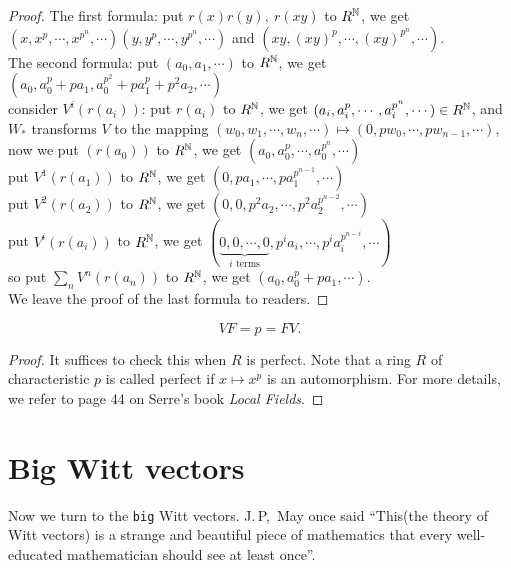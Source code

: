 \begin{proof}
The first formula: put $r(x)r(y),\ r(xy)$ to $R^{\mathbb{N}}$, we get $(x,x^p,\cdots,x^{p^n},\cdots)(y,y^p,\cdots,y^{p^n},\cdots)$ and $(xy,(xy)^p,\cdots,(xy)^{p^n},\cdots)$.\\
The second formula: put $(a_0,a_1,\cdots)$ to $R^{\mathbb{N}}$, we get $(a_0,a_0^p+pa_1,a_0^{p^2}+pa_1^p+p^2a_2,\cdots)$\\
consider $V^i(r(a_i))$: put $r(a_i)$ to $R^{\mathbb{N}}$, we get $(a_i,a_i^p,\cdots,a_i^{p^n},\cdots)\in R^{\mathbb{N}}$, and $W_*$ transforms $V$ to the mapping $(w_0,w_1,\cdots,w_n,\cdots)\mapsto (0,pw_0,\cdots,pw_{n-1},\cdots)$, \\
now we put $(r(a_0))$ to $R^{\mathbb{N}}$, we get $(a_0,a_0^p,\cdots,a_0^{p^n},\cdots)$\\
put $V^1(r(a_1))$ to $R^{\mathbb{N}}$, we get $(0,pa_1,\cdots,pa_1^{p^{n-1}},\cdots)$\\
put $V^2(r(a_2))$ to $R^{\mathbb{N}}$, we get $(0,0,p^2a_2,\cdots,p^2a_2^{p^{n-2}},\cdots)$\\
put $V^i(r(a_i))$ to $R^{\mathbb{N}}$, we get $(\underbrace{0,0,\cdots,0}_{i\mbox{ terms}},p^ia_i,\cdots,p^ia_i^{p^{n-i}},\cdots)$\\
so put $\sum_n V^n(r(a_n))$ to $R^{\mathbb{N}}$, we get $(a_0,a_0^p+pa_1,\cdots)$.\\
We leave the proof of the last formula to readers.
\end{proof}
\begin{prop}
	\[VF=p=FV.\]
\end{prop}
\begin{proof}
It suffices to check this when $R$ is perfect. Note that a ring $R$ of characteristic $p$ is called perfect if $x\mapsto x^p$ is an automorphism. For more details, we refer to page 44 on Serre's book {\em Local Fields}.
\end{proof}

\section{Big Witt vectors} %
\label{sec:big_witt_vectors}
Now we turn to the \texttt{big} Witt vectors. J.\,P,\ May once said ``This(the theory of Witt vectors) is a strange and beautiful piece of mathematics that every well-educated mathematician should see at least once''.

